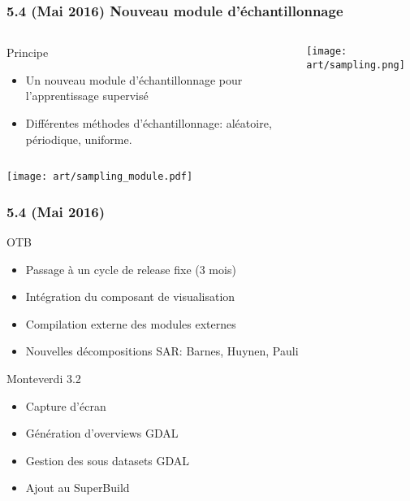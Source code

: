 \documentclass[8pt]{beamer}
\begin{document}
\begin{frame}
\frametitle{5.4 (Mai 2016) Nouveau module d'échantillonnage}
\begin{columns}

\begin{column}{0.6\textwidth}
\begin{block}{Principe}
\begin{itemize}
\item Un nouveau module d'échantillonnage pour l'apprentissage supervisé
\item Différentes méthodes d'échantillonnage: aléatoire, périodique, uniforme.
\end{itemize}
\end{block}
\end{column}

\begin{column}{0.4\textwidth}
\texttt{[image: art/sampling.png]}
\end{column}
\end{columns}

\begin{center}
\texttt{[image: art/sampling\_module.pdf]}
\end{center}

\end{frame}

\begin{frame}
\frametitle{5.4 (Mai 2016)}
\begin{block}{OTB}
\begin{itemize}
\item Passage à un cycle de release fixe (3 mois)
\item Intégration du composant de visualisation
\item Compilation externe des modules externes
\item Nouvelles décompositions SAR: Barnes, Huynen, Pauli
\end{itemize}
\end{block}

\begin{block}{Monteverdi 3.2}
\begin{itemize}
\item Capture d'écran
\item Génération d'overviews GDAL
\item Gestion des sous datasets GDAL
\item Ajout au SuperBuild
\end{itemize}
\end{block}
\end{frame}
\end{document}
